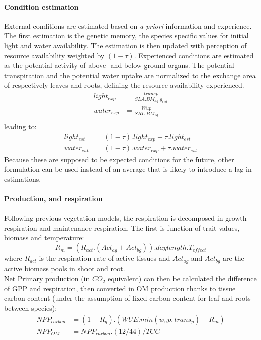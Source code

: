 \documentclass[a4paper,twoside, justified,marginals=raggedright]{tufte-handout}
\begin{document}
\paragraph{Condition estimation} External conditions are estimated based on \textit{a priori} information and experience. The first estimation is the genetic memory, the species specific values for initial light and water availability. The estimation is then updated with perception of resource availability weighted by $(1- \tau)$. Experienced conditions are estimated as the potential activity of above- and below-ground organs. The potential transpiration and the potential water uptake are normalized to the exchange area of respectively leaves and roots, defining the resource availability experienced. 
\begin{align}
light_{exp} &= \frac{transp}{SLA . BM_{ag}.g_{red}}\\
water_{exp} &= \frac{Wup}{SRL . BM_{bg}}\\
\end{align}
leading to:
\begin{align}
light_{est} &= (1 - \tau).light_{exp} + \tau . light_{est}\\
water_{est} &= (1 - \tau).water_{exp} + \tau . water_{est}
\end{align}
\indent Because these are supposed to be expected conditions for the future, other formulation can be used instead of an average that is likely to introduce a lag in estimations.

\paragraph{Production, and respiration} Following previous vegetation models, the respiration is decomposed in growth respiration and maintenance respiration. The first is function of trait values, biomass and temperature:
\begin{equation}
R_{m} = \left(R_{act}.\left(Act_{ag} + Act_{bg}\right)\right) . daylength . T_{effect}
\end{equation}
where $R_{act}$ is the respiration rate of active tissues and $Act_{ag}$ and $Act_{bg}$ are the active biomass pools in shoot and root.\\
\indent Net Primary production (in $CO_{2}$ equivalent) can then be calculated the difference of GPP and respiration, then converted in OM production thanks to tissue carbon content (under the assumption of fixed carbon content for leaf and roots between species):
 \begin{align}
 NPP_{carbon} &= (1- R_{g}) . (WUE . min(w_up, trans_p) - R_{m})\\
 NPP_{OM} &= NPP_{carbon} . (12/44) / TCC
\end{align} 
\end{document}
